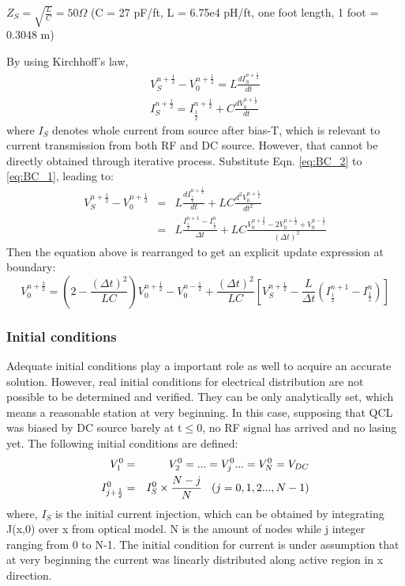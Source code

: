 \documentclass[11pt,final]{scrbook}
\begin{document}
$Z_{S}=\sqrt{\frac{L}{C}}=50\Omega$ (C = 27 pF/ft, L = 6.75e4 pH/ft, one foot length, 1 foot = 0.3048 m)

By using Kirchhoff's law, 
\begin{eqnarray}
{ V }_{ S }^{n+\frac{1}{2}}-{V}_{0}^{n+\frac{1}{2}} = L\frac{d{I}_{S}^{n+\frac{1}{2}}}{d{t}}\\\label{eq:BC_1}
{ I }_{ S }^{n+\frac{1}{2}} = { I }_{ \frac{1}{2}}^{n+\frac{1}{2}}+C\frac{d{V}_{0}^{n+\frac{1}{2}}}{d{t}}\label{eq:BC_2}
\end{eqnarray}
where ${ I }_{ S}$ denotes whole current from source after bias-T, which is relevant to current transmission from both RF and DC source. However, that cannot be directly obtained through iterative process. Substitute Eqn. \ref{eq:BC_2} to \ref{eq:BC_1}, leading to:
\begin{eqnarray}
{ V }_{ S }^{n+\frac{1}{2}}-{V}_{0}^{n+\frac{1}{2}} &=& L\frac{d{I}_{\frac{1}{2}}^{n+\frac{1}{2}}}{d{t}}+LC\frac{d^{2}{V}_{0}^{n+\frac{1}{2}}}{ dt^{2}}\\
&=& L\frac{{I}_{\frac{1}{2}}^{n+1}-{I}_{\frac{1}{2}}^{n}}{\Delta t}+LC\frac{{V}_{0}^{n+\frac{3}{2}}-2{V}_{0}^{n+\frac{1}{2}}+{V}_{0}^{n-\frac{1}{2}}}{(\Delta t)^{2}}
\end{eqnarray}
Then the equation above is rearranged to get an explicit update expression at boundary:
\begin{equation}
{ V }_{ 0 }^{ n+\frac{3}{2} } = (2-\frac{(\Delta t)^{2}}{LC}){ V }_{ 0 }^{ n+\frac{1}{2} }-{ V }_{ 0 }^{ n-\frac{1}{2} }+\frac{(\Delta t)^{2}}{LC}[V_{S}^{n+\frac{1}{2}}-\frac{L}{\Delta t}({I}_{\frac{1}{2}}^{n+1}-{I}_{\frac{1}{2}}^{n})]
\end{equation}


\subsubsection{Initial conditions}
Adequate initial conditions play a important role as well to acquire an accurate solution. However, real initial conditions for electrical distribution are not possible to be determined and verified. They can be only analytically set, which means a reasonable station at very beginning. In this case, supposing that QCL was biased by DC source barely at t$\leqslant 0$, no RF signal has arrived and no lasing yet. The following initial conditions are defined:
\begin{eqnarray}
V_{1}^{0} &=& V_{2}^{0} =...=V_{j}^{0}...=V_{N}^{0} = V_{DC}\\
I_{j+\frac{1}{2}}^{0} &=& I_{S}^{0}\times \frac{N-j}{N} \hspace{3mm} (j=0,1,2...,N-1)
\end{eqnarray}
where, $I_{S}$ is the initial current injection, which can be obtained by integrating J(x,0) over x from optical model. N is the amount of nodes while j integer ranging from 0 to N-1. The initial condition for current is under assumption that at very beginning the current was linearly distributed along active region in x direction.
\end{document}
